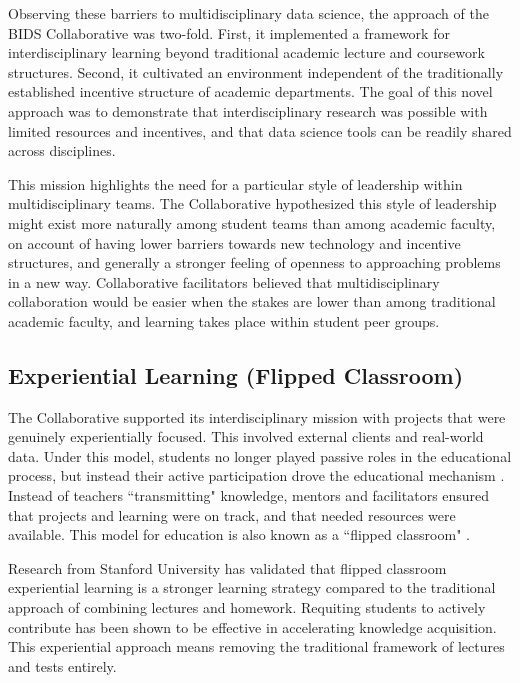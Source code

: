 \documentclass[12pt]{article}
\begin{document}
Observing these barriers to multidisciplinary data science, the approach of the BIDS Collaborative was two-fold. First, it implemented a framework for interdisciplinary learning beyond traditional academic lecture and coursework structures. Second, it cultivated an environment independent of the traditionally established incentive structure of academic departments. The goal of this novel approach was to demonstrate that interdisciplinary research was possible with limited resources and incentives, and that data science tools can be readily shared across disciplines.

This mission highlights the need for a particular style of leadership within multidisciplinary teams.  The Collaborative hypothesized this style of leadership might exist more naturally among student teams than among academic faculty, on account of having lower barriers towards new technology and incentive structures, and generally a stronger feeling of openness to approaching problems in a new way.  Collaborative facilitators believed that multidisciplinary collaboration would be easier when the stakes are lower than among traditional academic faculty, and learning takes place within student peer groups.

\subsection{Experiential Learning (Flipped Classroom)}

The Collaborative supported its interdisciplinary mission with projects that were genuinely experientially focused.  This involved external clients and real-world data. Under this model, students no longer played passive roles in the educational process, but instead their active participation drove the educational mechanism \citep{beard2010experiential}. Instead of teachers ``transmitting" knowledge, mentors and facilitators ensured that projects and learning were on track, and that needed resources were available. This model for education is also known as a ``flipped classroom" \citep{Horn2013}.

Research from Stanford University \citep{plotnikoff_classes_2013} has validated that flipped classroom experiential learning is a stronger learning strategy compared to the traditional approach of combining lectures and homework. Requiting students to actively contribute has been shown to be effective in accelerating knowledge acquisition. This experiential approach means removing the traditional framework of lectures and tests entirely. 
\end{document}
